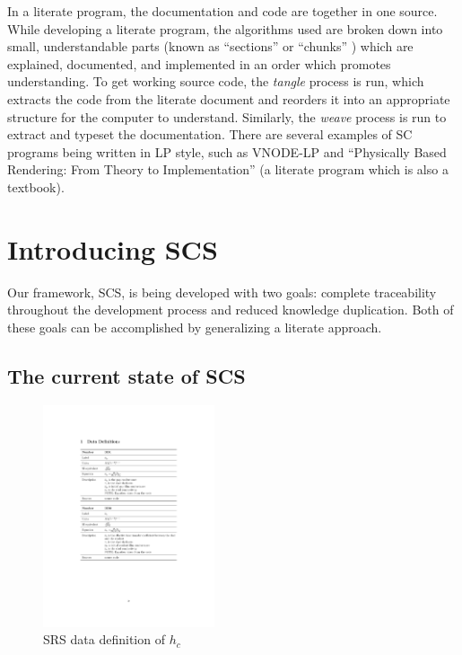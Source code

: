 \documentclass{sig-alternate-05-2015}
\newcommand{\lss}{SCS}
\begin{document}
In a literate program, the documentation and code are together in one source.
While developing a literate program, the algorithms used are broken down into
small, understandable parts (known as ``sections'' \cite{Knuth1984} or
``chunks'' \cite{JohnsonAndJohnson1997}) which are explained, documented, and
implemented in an order which promotes understanding. To get working source
code, the \textit{tangle} process is run, which extracts the code from the
literate document and reorders it into an appropriate structure for the computer
to understand. Similarly, the \textit{weave} process is run to extract and
typeset the documentation.
There are several examples of SC programs being written in LP style, such as
VNODE-LP \cite{Nedialkov2006} and ``Physically Based Rendering: From Theory to
Implementation'' \cite{PharrAndHumphreys2004} (a literate program which is also
a textbook).

\section{Introducing \lss} \label{sec:lss} %

Our framework, \lss, is being developed with two goals: complete traceability
throughout the development process and reduced knowledge duplication. Both of
these goals can be accomplished by generalizing a literate approach.

\subsection{The current state of \lss} \label{ssec:example}

\begin{figure}
	\includegraphics[width=0.45\textwidth]{h_c.pdf}
	\caption{SRS data definition of $h_c$}
	\label{fig:h_c}
\end{figure}	
\end{document}

